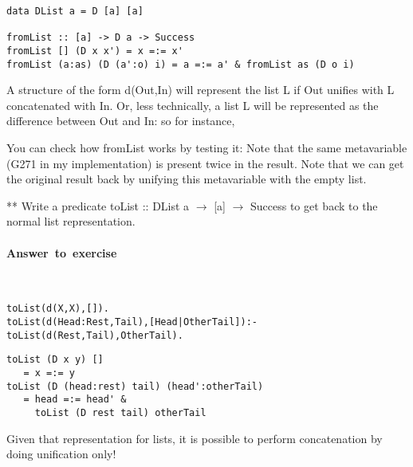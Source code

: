 \documentclass{article}
\newcounter{question}
\newenvironment{ans}{\begin{framed}\paragraph{Answer~to~exercise~\arabic{question}}}{\end{framed}}
\newcommand{\correctedLastYear}[1]{}
\begin{document}
\Curry{}
\begin{verbatim}
data DList a = D [a] [a]

fromList :: [a] -> D a -> Success
fromList [] (D x x') = x =:= x'
fromList (a:as) (D (a':o) i) = a =:= a' & fromList as (D o i)
\end{verbatim}


A structure of the form \textsf{d(Out,In)} will represent the list
\textsf{L} if \textsf{Out} unifies with \textsf{L} concatenated with
\textsf{In}. Or, less technically, a list L will be represented as the
difference between Out and In: so for instance,



You can check how fromList works by testing it:
Note that the same metavariable (G271 in my implementation) is present twice in
the result. Note that we can get the original result back by unifying this
metavariable with the empty list.

\begin{question}{**\correctedLastYear6}
Write a predicate \textsf{toList :: DList a $\rightarrow$ [a] $\rightarrow$ Success} to get back to the normal list representation.

\begin{ans}
~
\begin{verbatim}
toList(d(X,X),[]).
toList(d(Head:Rest,Tail),[Head|OtherTail]):- toList(d(Rest,Tail),OtherTail).
\end{verbatim}

\begin{verbatim}
toList (D x y) [] 
   = x =:= y
toList (D (head:rest) tail) (head':otherTail) 
   = head =:= head' & 
     toList (D rest tail) otherTail  
\end{verbatim}
  
\end{ans}

\end{question}

Given that representation for lists, it is possible to perform concatenation by
doing unification only!
\end{document}
